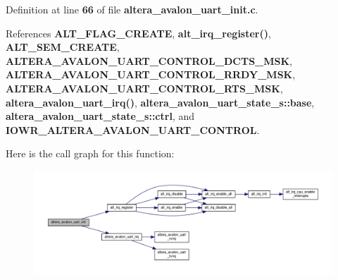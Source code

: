Definition at line {\bf 66} of file {\bf altera\+\_\+avalon\+\_\+uart\+\_\+init.\+c}.



References {\bf A\+L\+T\+\_\+\+F\+L\+A\+G\+\_\+\+C\+R\+E\+A\+TE}, {\bf alt\+\_\+irq\+\_\+register()}, {\bf A\+L\+T\+\_\+\+S\+E\+M\+\_\+\+C\+R\+E\+A\+TE}, {\bf A\+L\+T\+E\+R\+A\+\_\+\+A\+V\+A\+L\+O\+N\+\_\+\+U\+A\+R\+T\+\_\+\+C\+O\+N\+T\+R\+O\+L\+\_\+\+D\+C\+T\+S\+\_\+\+M\+SK}, {\bf A\+L\+T\+E\+R\+A\+\_\+\+A\+V\+A\+L\+O\+N\+\_\+\+U\+A\+R\+T\+\_\+\+C\+O\+N\+T\+R\+O\+L\+\_\+\+R\+R\+D\+Y\+\_\+\+M\+SK}, {\bf A\+L\+T\+E\+R\+A\+\_\+\+A\+V\+A\+L\+O\+N\+\_\+\+U\+A\+R\+T\+\_\+\+C\+O\+N\+T\+R\+O\+L\+\_\+\+R\+T\+S\+\_\+\+M\+SK}, {\bf altera\+\_\+avalon\+\_\+uart\+\_\+irq()}, {\bf altera\+\_\+avalon\+\_\+uart\+\_\+state\+\_\+s\+::base}, {\bf altera\+\_\+avalon\+\_\+uart\+\_\+state\+\_\+s\+::ctrl}, and {\bf I\+O\+W\+R\+\_\+\+A\+L\+T\+E\+R\+A\+\_\+\+A\+V\+A\+L\+O\+N\+\_\+\+U\+A\+R\+T\+\_\+\+C\+O\+N\+T\+R\+OL}.



Here is the call graph for this function\+:
\nopagebreak
\begin{figure}[H]
\begin{center}
\leavevmode
\includegraphics[width=350pt]{dd/dbc/altera__avalon__uart_8h_a7649053bcc37f15c419e9253973a0568_cgraph}
\end{center}
\end{figure}


